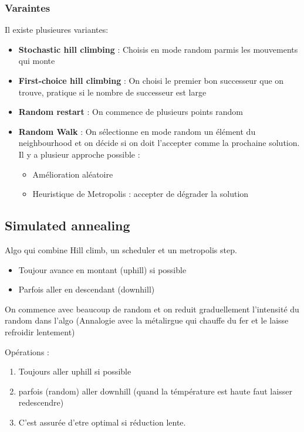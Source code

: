 	\subsubsection{Varaintes}
		Il existe plusieures variantes:
		\begin{itemize}
			\item \textbf{Stochastic hill climbing} : Choisis en mode random parmis les mouvements qui monte
			\item \textbf{First-choice hill climbing} : On choisi le premier bon successeur que on trouve, pratique si le nombre de successeur est large
			\item \textbf{Random restart} : On commence de plusieurs points random
			\item \textbf{Random Walk} : On sélectionne en mode random un élément du neighbourhood et on décide si on doit l'accepter comme la prochaine solution. Il y a plusieur approche possible :
			\begin{itemize}
				\item Amélioration aléatoire
				\item Heuristique de Metropolis : accepter de dégrader la solution
			\end{itemize}
			
		\end{itemize}
		
		
	\subsection{Simulated annealing}
		Algo qui combine Hill climb, un scheduler et un metropolis step.
		\begin{itemize}
			\item Toujour avance en montant (uphill) si possible
			\item Parfois aller en descendant (downhill) 
		\end{itemize}
		
		On commence avec beaucoup de random et on reduit graduellement l'intensité du random dans l'algo (Annalogie avec la métalirgue qui chauffe du fer et le laisse refroidir lentement)
		
		Opérations :
		\begin{enumerate}
			\item Toujours aller uphill si possible
			\item parfois (random) aller downhill (quand la témpérature est haute faut laisser redescendre)
			\item C'est assurée d'etre optimal si réduction lente.
		\end{enumerate}
		
